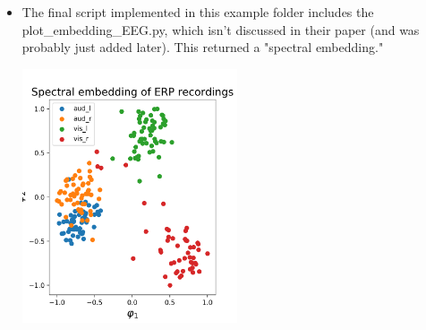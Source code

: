 \documentclass[12pt,letterpaper,boxed]{math_hw_pset}
\begin{document}
\begin{solution}
\begin{itemize}
        \item The final script implemented in this example folder includes the  
        plot\_embedding\_EEG.py, which isn't discussed in their paper (and was probably just added later). 
        This returned a "spectral embedding."
        \begin{center}
            \includegraphics[width= 0.5\textwidth]{plot_embedding_EEG.png}
        \end{center}
    \end{itemize}
\end{solution}
\end{document}
